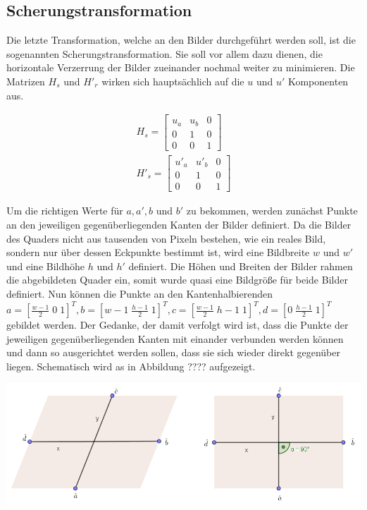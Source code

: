 \subsection{Scherungstransformation}

Die letzte Transformation, welche an den Bilder durchgeführt werden soll, ist die sogenannten Scherungstransformation. Sie soll vor allem dazu dienen, die horizontale Verzerrung der Bilder zueinander nochmal weiter zu minimieren. Die Matrizen $H_s$ und $H'_r$ wirken sich hauptsächlich auf die $u$ und $u'$ Komponenten aus. 

\begin{gather}
	H_s =\begin{bmatrix}
		u_a&u_b&0\\
		0&1&0\\
		0&0&1
	\end{bmatrix}\\
	H'_s =\begin{bmatrix}
		u'_a&u'_b&0\\
		0&1&0\\
		0&0&1
	\end{bmatrix}
\end{gather}

Um die richtigen Werte für $a, a', b$ und $b'$ zu bekommen, werden zunächst Punkte an den jeweiligen gegenüberliegenden Kanten der Bilder definiert. Da die Bilder des Quaders nicht aus tausenden von Pixeln bestehen, wie ein reales Bild, sondern nur über dessen Eckpunkte bestimmt ist, wird eine Bildbreite $w$ und $w'$ und eine Bildhöhe $h$ und $h'$ definiert. Die Höhen und Breiten der Bilder rahmen die abgebildeten Quader ein, somit wurde quasi eine Bildgröße für beide Bilder definiert. Nun können die Punkte an den Kantenhalbierenden $a = [\frac{w-1}{2} \; 0 \; 1]^T, b = [w-1 \; \frac{h-1}{2}\; 1]^T, c = [\frac{w-1}{2} \; h-1 \; 1]^T, d = [0 \; \frac{h-1}{2} \; 1]^T$ gebildet werden. Der Gedanke, der damit verfolgt wird ist, dass die Punkte der jeweiligen gegenüberliegenden Kanten mit einander verbunden werden können und dann so ausgerichtet werden sollen, dass sie sich wieder direkt gegenüber liegen. Schematisch wird as in Abbildung ???? aufgezeigt.

\begin{minipage}{\linewidth}
	\centering
	\includegraphics[width=.8\linewidth]{images/Scherungstransformation.png}
\end{minipage}\\ \\

